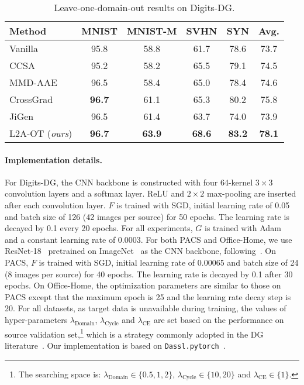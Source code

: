 \documentclass[runningheads]{llncs}
\begin{document}
\begin{table}[t]
\tabstyle{6pt}
\begin{tabular}{l | c c c c | c}
\hline
Method & MNIST & MNIST-M & SVHN & SYN & Avg. \\ \hline
Vanilla & 95.8 & 58.8 & 61.7 & 78.6 & 73.7 \\
CCSA~\cite{motiian2017unified} & 95.2 & 58.2 & 65.5 & 79.1 & 74.5 \\
MMD-AAE~\cite{li2018mmdaae} & 96.5 & 58.4 & 65.0 & 78.4 & 74.6 \\
CrossGrad~\cite{shankar2018generalizing} & \textbf{96.7} & 61.1 & 65.3 & 80.2 & 75.8 \\
JiGen~\cite{cvpr19JiGen} & 96.5 & 61.4 & 63.7 & 74.0 & 73.9 \\
L2A-OT (\emph{ours}) & \textbf{96.7} & \textbf{63.9} & \textbf{68.6} & \textbf{83.2} & \textbf{78.1} \\
\hline
\end{tabular}
\caption{Leave-one-domain-out results on Digits-DG.}
\label{tab:resOnDigitsDG}
\end{table}

\paragraph{Implementation details.}
For Digits-DG, the CNN backbone is constructed with four 64-kernel $3\times3$ convolution layers and a softmax layer. ReLU and $2\times2$ max-pooling are inserted after each convolution layer. $F$ is trained with SGD, initial learning rate of 0.05 and batch size of 126 (42 images per source) for 50 epochs. The learning rate is decayed by 0.1 every 20 epochs. For all experiments, $G$ is trained with Adam~\cite{kingma2014adam} and a constant learning rate of 0.0003. For both PACS and Office-Home, we use ResNet-18~\cite{he2016deep} pretrained on ImageNet~\cite{deng2009imagenet} as the CNN backbone, following~\cite{d2018domain,cvpr19JiGen,li2019episodic}. On PACS, $F$ is trained with SGD, initial learning rate of 0.00065 and batch size of 24 (8 images per source) for 40 epochs. The learning rate is decayed by 0.1 after 30 epochs. On Office-Home, the optimization parameters are similar to those on PACS except that the maximum epoch is 25 and the learning rate decay step is 20. For all datasets, as target data is unavailable during training, the values of hyper-parameters $\lambda_{\mathrm{Domain}}$, $\lambda_{\mathrm{Cycle}}$ and $\lambda_{\mathrm{CE}}$ are set based on the performance on source validation set,\footnote{The searching space is: $\lambda_{\mathrm{Domain}} \in \{0.5, 1, 2\}$, $\lambda_{\mathrm{Cycle}} \in \{10, 20\}$ and $\lambda_{\mathrm{CE}} \in \{1\}$.} which is a strategy commonly adopted in the DG literature~\cite{cvpr19JiGen,li2019episodic}. Our implementation is based on \texttt{Dassl.pytorch}~\cite{zhou2020domain}. 
\end{document}
